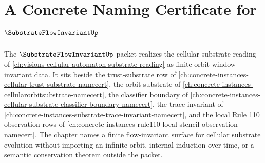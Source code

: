 \chapter{A Concrete Naming Certificate for $\SubstrateFlowInvariantUp$}
\label{ch:concrete-instances-substrate-flow-invariant-namecert}

The $\SubstrateFlowInvariantUp$ packet realizes the cellular substrate reading of \autoref{ch:visions-cellular-automaton-substrate-reading} as finite orbit-window invariant data. It sits beside the trust-substrate row of \autoref{ch:concrete-instances-cellular-trust-substrate-namecert}, the orbit substrate of \autoref{ch:concrete-instances-cellularorbitsubstrate-namecert}, the classifier boundary of \autoref{ch:concrete-instances-cellular-substrate-classifier-boundary-namecert}, the trace invariant of \autoref{ch:concrete-instances-substrate-trace-invariant-namecert}, and the local Rule 110 observation rows of \autoref{ch:concrete-instances-rule110-local-stencil-observation-namecert}. The chapter names a finite flow-invariant surface for cellular substrate evolution without importing an infinite orbit, internal induction over time, or a semantic conservation theorem outside the packet.

